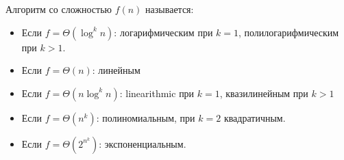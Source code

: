 \documentclass[24pt,pdf,hyperref={unicode},aspectratio=169]{beamer}
\begin{document}
\begin{frame}

Алгоритм со сложностью $f(n)$ называется:

\begin{itemize}

\item Если $f=\Theta\left(\log^k n\right)$: логарифмическим при $k=1$, полилогарифмическим при $k>1$.

\item Если $f=\Theta(n)$: линейным

\item Если $f=\Theta\left(n\log^k n\right)$: linearithmic при $k=1$, квазилинейным при $k>1$

\item Если $f=\Theta\left(n^k\right)$: полиномиальным, при $k=2$ квадратичным.

\item Если $f=\Theta\left(2^{n^k}\right)$: экспоненциальным.
\end{itemize}

\end{frame}
\end{document}
